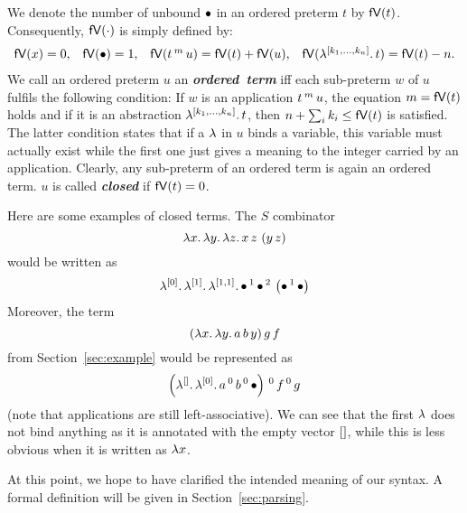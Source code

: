 \documentclass[submission,copyright,creativecommons]{eptcs}
\newcommand{\define}[1]{\mbox{\textbf{\textit{#1}}}}
\begin{document}
We denote the number of unbound $\mathord{\bullet}$ in an ordered preterm $t$ by $\mathsf{fV}(t)$. Consequently, $\mathsf{fV}(\cdot)$ is simply defined by: 
\[
\begin{array}{cccc}
\mathsf{fV}(x) = 0, & \mathsf{fV}(\mathord{\bullet}) = 1, & \mathsf{fV}(t \, ^{m} \, u) = \mathsf{fV}(t) + \mathsf{fV}(u), & \mathsf{fV}(\lambda ^{[k_1, \ldots, k_n]} . \, t) = \mathsf{fV}(t) - n.
\end{array}
\]
We call an ordered preterm $u$ an \define{ordered term} iff each sub-preterm $w$ of $u$ fulfils the following condition: If $w$ is an application $t \, ^{m} \, u$, the equation $m = \mathsf{fV}(t)$ holds and if it is an abstraction $\lambda ^{[k_1, \ldots, k_n]} . \, t$, then $n + \sum_i k_i \leq \mathsf{fV}(t)$ is satisfied. The latter condition states that if a $\lambda$ in $u$ binds a variable, this variable must actually exist while the first one just gives a meaning to the integer carried by an application. Clearly, any sub-preterm of an ordered term is again an ordered term. 
%
$u$ is called \define{closed} if $\mathsf{fV}(t) = 0$.

Here are some examples of closed terms.
The $S$ combinator 
\[
\lambda {x}. \, \lambda {y}. \, \lambda {z}. \, x \, z \, \left( y \, z \right)
\]
would be written as 
\[\lambda ^{[0]} . \, \lambda ^{[1]} . \, \lambda ^{[1,1]} . \, \mathord{\bullet} \, ^{1} \, \mathord{\bullet} \, ^{2} \, \left( \mathord{\bullet} \, ^{1} \, \mathord{\bullet} \right)
\]
Moreover, the term 
\[
(\lambda {x}. \, \lambda {y}. \, a \, b \, y) \, g \, f
\]
from Section~\ref{sec:example} would be represented as
\[
\left(\lambda ^{[]} . \, \lambda ^{[0]} . \, a \, ^{0} \, b \, ^{0} \, \mathord{\bullet}\right) \, ^{0} \, f  \, ^{0} \, g
\]
(note that applications are still left-associative). We can see that the first $\lambda$ does not bind anything as it is annotated with the empty vector $[]$, while this is less obvious when it is written as $\lambda x$. 

At this point, we hope to have clarified the intended meaning of our syntax. A formal definition will be given in Section~\ref{sec:parsing}.
\end{document}
